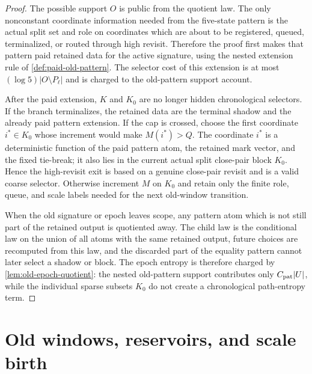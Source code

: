 \documentclass[11pt]{article}
\newcommand{\Cref}[1]{\ref{#1}}
\theoremstyle{remark}
\begin{document}
\begin{proof}
The possible support $O$ is public from the quotient law.  The only nonconstant coordinate information needed from the five-state pattern is the actual split set and role on coordinates which are about to be registered, queued, terminalized, or routed through high revisit.  Therefore the proof first makes that pattern paid retained data for the active signature, using the nested extension rule of \Cref{def:paid-old-pattern}.  The selector cost of this extension is at most $(\log 5)|O\setminus P_\ell|$ and is charged to the old-pattern support account.

After the paid extension, $K$ and $K_0$ are no longer hidden chronological selectors.  If the branch terminalizes, the retained data are the terminal shadow and the already paid pattern extension.  If the cap is crossed, choose the first coordinate $i^*\in K_0$ whose increment would make $M(i^*)>Q$.  The coordinate $i^*$ is a deterministic function of the paid pattern atom, the retained mark vector, and the fixed tie-break; it also lies in the current actual split close-pair block $K_0$.  Hence the high-revisit exit is based on a genuine close-pair revisit and is a valid coarse selector.  Otherwise increment $M$ on $K_0$ and retain only the finite role, queue, and scale labels needed for the next old-window transition.

When the old signature or epoch leaves scope, any pattern atom which is not still part of the retained output is quotiented away.  The child law is the conditional law on the union of all atoms with the same retained output, future choices are recomputed from this law, and the discarded part of the equality pattern cannot later select a shadow or block.  The epoch entropy is therefore charged by \Cref{lem:old-epoch-quotient}: the nested old-pattern support contributes only $C_{\rm pat}|U|$, while the individual sparse subsets $K_0$ do not create a chronological path-entropy term.
\end{proof}

\section{Old windows, reservoirs, and scale birth}\label{sec:old-window}
\end{document}
